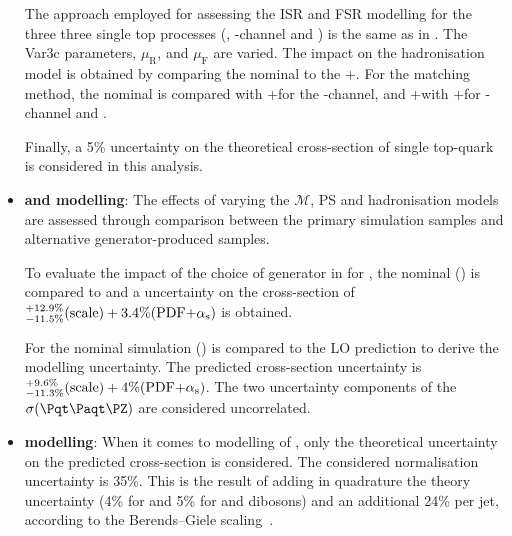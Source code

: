 \begin{itemize}
		The approach employed for assessing the ISR
		and FSR modelling for the three three single top processes (\tchannel, \tW-channel and \schannel)  
		is the same as in \ttH. The Var3c parameters, $\mu_{\text{R}}$, and $\mu_{\text{F}}$ are varied.
		The impact on the hadronisation model is obtained by comparing the nominal to the
		\POWHEG+\HERWIG[7.1.6]. For the matching method, the nominal is compared with
		\AMCatNLO+\PYTHIA[8] for the \tW-channel, and \POWHEG+\HERWIG[7.1.6] with 
		\AMCatNLO+\HERWIG[7.1.6] for \tW-channel and \schannel.
		
		Finally, a 5\% uncertainty on the theoretical cross-section of single top-quark is considered 
		in this analysis.



	\item \textbf{\ttW and \ttZ modelling}: 
		The effects of varying the $\mathcal{M}$, PS and hadronisation models are 
		assessed through comparison between the primary simulation samples and 
		alternative generator-produced samples. 
	
		To evaluate the impact of the choice of generator in for \ttW,
		the nominal (\SHERPA[2.2.10]) is compared to \MGNLO[2.3.3] and a uncertainty on the cross-section of  
		$^{+12.9\%}_{-11.5\%}(\text{scale})+3.4\%(\text{PDF+\ensuremath{\alpha_{\text{s}}}})$ is obtained. 
		
		For \ttZ the nominal simulation (\MGNLO[2.3.3]) is compared to the \SHERPA[2.2.0] LO 
		prediction to derive the modelling uncertainty. 
		The predicted \ttZ cross-section uncertainty 
		is $^{+9.6\%}_{-11.3\%}(\text{scale})+4\%(\text{PDF+\ensuremath{\alpha_{\text{s}}}})$. 
		The two uncertainty components of the $\sigma(\ttZ)$ are considered uncorrelated.
		
	
	\item \textbf{\Zjets modelling}: When it comes to modelling of \Zjets, only the theoretical uncertainty on the 
	predicted cross-section is considered. The considered normalisation uncertainty is 35\%. %
	This is the result of adding in quadrature the theory uncertainty (4\% for \Wjets and 5\% 
	for \Zjets and dibosons) and an additional 24\% per jet, according to the Berends–Giele scaling~\cite{Berends:1991}.


\end{itemize}

